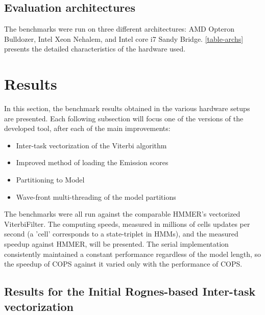 


\subsection{Evaluation architectures}

The benchmarks were run on three different architectures: AMD Opteron Bulldozer, Intel Xeon Nehalem, and Intel core i7 Sandy Bridge. \autoref{table-archs} presents the detailed characteristics of the hardware used.





\section{Results}

In this section, the benchmark results obtained in the various hardware setups are presented. Each following subsection will focus one of the versions of the developed tool, after each of the main improvements:

\begin{itemize}[noitemsep,topsep=0pt,nolistsep]
\item Inter-task vectorization of the Viterbi algorithm
\item Improved method of loading the Emission scores
\item Partitioning to Model
\item Wave-front multi-threading of the model partitions
\end{itemize}

The benchmarks were all run against the comparable HMMER's vectorized ViterbiFilter. The computing speeds, measured in millions of cells updates per second (a 'cell' corresponds to a state-triplet in HMMs), and the measured speedup against HMMER, will be presented. The serial implementation consistently maintained a constant performance regardless of the model length, so the speedup of COPS against it varied only with the performance of COPS. 


\subsection{Results for the Initial Rognes-based Inter-task vectorization}
\label{Results for the Initial Rognes-based Inter-task vectorization}

